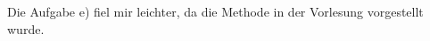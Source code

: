 \subsection{}
\subsection{}
\subsection{}
\subsection{}
\subsection{}
Die Aufgabe e) fiel mir leichter, da die Methode in der Vorlesung vorgestellt wurde.
